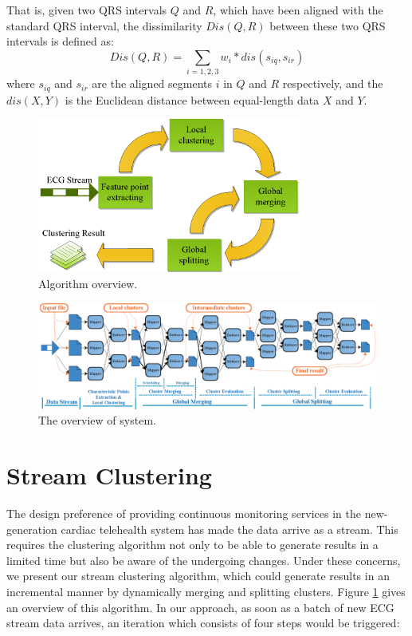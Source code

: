 \documentclass[conference]{IEEEtran}
\begin{document}
That is, given two QRS intervals $ Q $ and $ R $, which have been aligned with the standard QRS interval, the dissimilarity $ Dis(Q, R) $ between these two QRS intervals is defined as:
\begin{equation}\label{eq_dissimilarity}
Dis(Q, R) = \sum_{i=1,2,3}{w_i * dis(s_{iq}, s_{ir} )}
\end{equation}
where $ s_{iq} $ and $ s_{ir} $ are the aligned segments $ i $ in $ Q $ and $ R $ respectively, and the $ dis(X, Y) $ is the Euclidean distance between equal-length data $ X $ and $ Y $.

\begin{figure}[!t]
\centering
\includegraphics[height=2.0in]{./Figure/algorithm_overview.eps}
\caption{Algorithm overview.}
\label{fig_algorithm_overview}
\end{figure}

\begin{figure}[!t]
\centering
\includegraphics[width=7.1in]{./Figure/system_overview.eps}
\caption{The overview of system.}
\label{fig_sys_overview}
\end{figure}

\section{Stream Clustering}
The design preference of providing continuous monitoring services in the new-generation cardiac telehealth system has made the data arrive as a stream. This requires the clustering algorithm not only to be able to generate results in a limited time but also be aware of the undergoing changes. Under these concerns, we present our stream clustering algorithm, which could generate results in an incremental manner by dynamically merging and splitting clusters. Figure \ref{fig_algorithm_overview} gives an overview of this algorithm. In our approach, as soon as a batch of new ECG stream data arrives, an iteration which consists of four steps would be triggered: 
\end{document}
